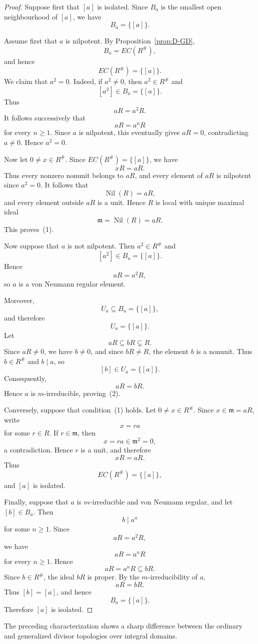 \documentclass[11pt]{amsart}
\theoremstyle{plain}
\theoremstyle{definition}
\theoremstyle{remark}
\numberwithin{equation}{section}
\begin{document}
\begin{proof}
	Suppose first that $[a]$ is isolated. Since $B_a$ is the smallest open
	neighbourhood of $[a]$, we have
	\[
	B_a=\{[a]\}.
	\]
	
	Assume first that $a$ is nilpotent. By
	Proposition~\ref{prop:D-GD},
	\[
	B_a=EC(R^\#),
	\]
	and hence
	\[
	EC(R^\#)=\{[a]\}.
	\]
	We claim that $a^2=0$. Indeed, if $a^2\neq0$, then
	$a^2\in R^\#$ and
	\[
	[a^2]\in B_a=\{[a]\}.
	\]
	Thus
	\[
	aR=a^2R.
	\]
	It follows successively that
	\[
	aR=a^nR
	\]
	for every $n\geq1$. Since $a$ is nilpotent, this eventually gives
	$aR=0$, contradicting $a\neq0$. Hence $a^2=0$.
	
	Now let $0\neq x\in R^\#$. Since
	$EC(R^\#)=\{[a]\}$, we have
	\[
	xR=aR.
	\]
	Thus every nonzero nonunit belongs to $aR$, and every element of $aR$
	is nilpotent since $a^2=0$. It follows that
	\[
	\operatorname{Nil}(R)=aR,
	\]
	and every element outside $aR$ is a unit. Hence $R$ is local with
	unique maximal ideal
	\[
	\mathfrak m=\operatorname{Nil}(R)=aR.
	\]
	This proves~(1).
	
	Now suppose that $a$ is not nilpotent. Then $a^2\in R^\#$ and
	\[
	[a^2]\in B_a=\{[a]\}.
	\]
	Hence
	\[
	aR=a^2R,
	\]
	so $a$ is a von Neumann regular element.
	
	Moreover,
	\[
	U_a\subseteq B_a=\{[a]\},
	\]
	and therefore
	\[
	U_a=\{[a]\}.
	\]
	Let
	\[
	aR\subseteq bR\subsetneq R.
	\]
	Since $aR\neq0$, we have $b\neq0$, and since $bR\neq R$, the element
	$b$ is a nonunit. Thus $b\in R^\#$ and $b\mid a$, so
	\[
	[b]\in U_a=\{[a]\}.
	\]
	Consequently,
	\[
	aR=bR.
	\]
	Hence $a$ is $m$-irreducible, proving~(2).
	
	Conversely, suppose that condition~(1) holds. Let
	$0\neq x\in R^\#$. Since $x\in\mathfrak m=aR$, write
	\[
	x=ra
	\]
	for some $r\in R$. If $r\in\mathfrak m$, then
	\[
	x=ra\in\mathfrak m^2=0,
	\]
	a contradiction. Hence $r$ is a unit, and therefore
	\[
	xR=aR.
	\]
	Thus
	\[
	EC(R^\#)=\{[a]\},
	\]
	and $[a]$ is isolated.
	
	Finally, suppose that $a$ is $m$-irreducible and von Neumann regular,
	and let $[b]\in B_a$. Then
	\[
	b\mid a^n
	\]
	for some $n\geq1$. Since
	\[
	aR=a^2R,
	\]
	we have
	\[
	aR=a^nR
	\]
	for every $n\geq1$. Hence
	\[
	aR=a^nR\subseteq bR.
	\]
	Since $b\in R^\#$, the ideal $bR$ is proper. By the
	$m$-irreducibility of $a$,
	\[
	aR=bR.
	\]
	Thus $[b]=[a]$, and hence
	\[
	B_a=\{[a]\}.
	\]
	Therefore $[a]$ is isolated.
\end{proof}


The preceding characterization shows a sharp difference between the
ordinary and generalized divisor topologies over integral domains.
\end{document}
